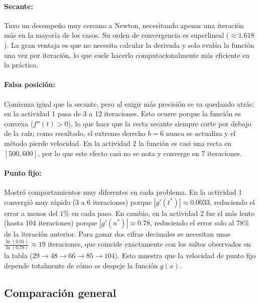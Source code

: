 \documentclass[11pt,a4paper]{article}
\begin{document}
\paragraph{Secante:}
Tuvo un desempeño muy cercano a Newton, necesitando apenas una iteración más en la mayoría de los casos. Su orden de convergencia es superlineal ($\approx 1.618$). La gran ventaja es que no necesita calcular la derivada y solo evalúa la función una vez por iteración, lo que suele hacerlo computacionalmente más eficiente en la práctica.

\paragraph{Falsa posición:}
Comienza igual que la secante, pero al exigir más precisión se va quedando atrás: en la actividad 1 pasa de 3 a 12 iteraciones. Esto ocurre porque la función es convexa ($f''(t) > 0$), lo que hace que la recta secante siempre corte por debajo de la raíz; como resultado, el extremo derecho $b=6$ nunca se actualiza y el método pierde velocidad. En la actividad 2 la función es casi una recta en $[500, 600]$, por lo que este efecto casi no se nota y converge en 7 iteraciones.

\paragraph{Punto fijo:}
Mostró comportamientos muy diferentes en cada problema. En la actividad 1 convergió muy rápido (3 a 6 iteraciones) porque $|g'(t^*)| \approx 0.0033$, reduciendo el error a menos del $1\%$ en cada paso. En cambio, en la actividad 2 fue el más lento (hasta 104 iteraciones) porque $|g'(n^*)| \approx 0.78$, reduciendo el error solo al $78\%$ de la iteración anterior. Para ganar dos cifras decimales se necesitan unas $\frac{\ln(0.01)}{\ln(0.78)} \approx 19$ iteraciones, que coincide exactamente con los saltos observados en la tabla ($29 \to 48 \to 66 \to 85 \to 104$). Esto muestra que la velocidad de punto fijo depende totalmente de cómo se despeje la función $g(x)$.

\subsection{Comparación general}
\end{document}
